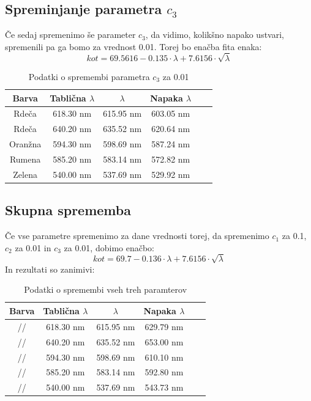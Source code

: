 \documentclass[11pt, a4paper]{article}
\theoremstyle{definition}
\theoremstyle{example}
\theoremstyle{izrek}
\begin{document}
\subsection{Spreminjanje parametra $c_3$}
Če sedaj spremenimo še parameter $c_3$, da vidimo, kolikšno napako ustvari, spremenili pa ga bomo za vrednost 0.01.
Torej bo enačba fita enaka:
$$kot=69.5616-0.135 \cdot \lambda+7.6156\cdot \sqrt{\lambda}$$
\begin{table}[H]
	\centering
	\begin{tabular}{|c|c|c|c|c|c|}
	\hline
Barva & Tablična $\lambda$ & $\lambda$ & Napaka $\lambda$ \\ 
\hline
\hline
 Rdeča & 618.30 nm & 615.95 nm & 603.05 nm  \\ 
\hline
Rdeča & 640.20 nm & 635.52 nm & 620.64 nm  \\ 
\hline
 Oranžna & 594.30 nm & 598.69 nm & 587.24 nm  \\ 
\hline
 Rumena & 585.20 nm & 583.14 nm & 572.82 nm  \\ 
\hline
 Zelena & 540.00 nm & 537.69 nm & 529.92 nm  \\ 
\hline
\end{tabular}
	\caption{Podatki o spremembi parametra $c_3$ za 0.01}	
\end{table}
\subsection{Skupna sprememba}
Če vse parametre spremenimo za dane vrednosti torej, da spremenimo $c_1$ za 0.1, $c_2$ za 0.01 in $c_3$ za 0.01, dobimo enačbo:
$$kot=69.7-0.136 \cdot \lambda+7.6156\cdot \sqrt{\lambda}$$
In rezultati so zanimivi:
\begin{table}[H]
	\centering
	\begin{tabular}{|c|c|c|c|c|c|}
	\hline
Barva & Tablična $\lambda$ & $\lambda$ & Napaka $\lambda$ \\ 
\hline
\hline
 // & 618.30 nm & 615.95 nm & 629.79 nm  \\ 
\hline
 // & 640.20 nm & 635.52 nm & 653.00 nm  \\ 
\hline
 // & 594.30 nm & 598.69 nm & 610.10 nm  \\ 
\hline
 // & 585.20 nm & 583.14 nm & 592.80 nm  \\ 
\hline
 // & 540.00 nm & 537.69 nm & 543.73 nm  \\ 
\hline
\end{tabular}
	\caption{Podatki o spremembi vseh treh paramterov}	
\end{table}
\end{document}
